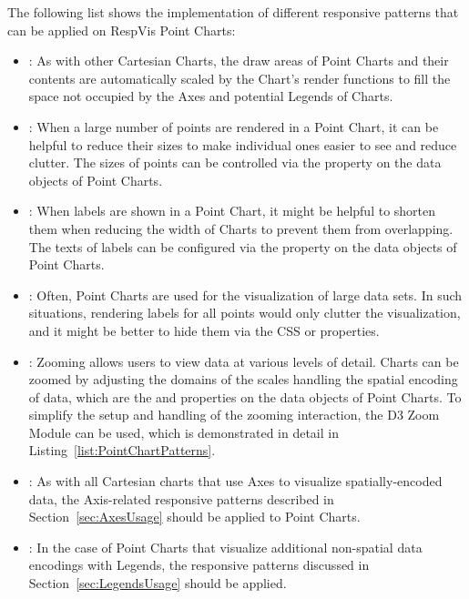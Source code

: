 The following list shows the implementation of different responsive
patterns that can be applied on RespVis Point Charts:
\begin{itemize}
\item {}: As with other Cartesian Charts, the
  draw areas of Point Charts and their contents are automatically
  scaled by the Chart's render functions to fill the space not
  occupied by the Axes and potential Legends of Charts.

\item {}: When a large number of points are
  rendered in a Point Chart, it can be helpful to reduce their sizes
  to make individual ones easier to see and reduce clutter.  The sizes
  of points can be controlled via the  property on the
  data objects of Point Charts.

\item {}: When labels are shown in a Point
  Chart, it might be helpful to shorten them when reducing the width
  of Charts to prevent them from overlapping.  The texts of labels can
  be configured via the  property on the data objects of
  Point Charts.

\item {}: Often, Point Charts are used for the
  visualization of large data sets.  In such situations, rendering
  labels for all points would only clutter the visualization, and it
  might be better to hide them via the CSS  or
   properties.

\item {}: Zooming allows users to view data at
  various levels of detail.  Charts can be zoomed by adjusting the
  domains of the scales handling the spatial encoding of data, which
  are the  and  properties on the data
  objects of Point Charts.  To simplify the setup and handling of the
  zooming interaction, the D3 Zoom Module \parencite{D3Zoom} can be
  used, which is demonstrated in detail in
  Listing~\ref{list:PointChartPatterns}.

\item {}: As with all Cartesian charts that
  use Axes to visualize spatially-encoded data, the Axis-related
  responsive patterns described in Section~\ref{sec:AxesUsage} should
  be applied to Point Charts.

\item {}: In the case of Point Charts
  that visualize additional non-spatial data encodings with Legends,
  the responsive patterns discussed in Section~\ref{sec:LegendsUsage}
  should be applied.
\end{itemize}




